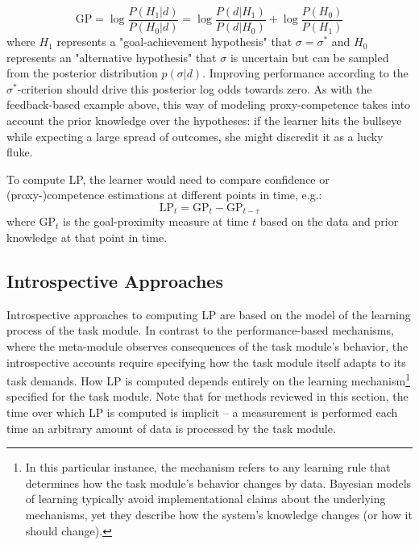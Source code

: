 \begin{equation}
   \mathrm{GP} = \log \frac{P(H_1|d)}{P(H_0|d)} = \log \frac{P(d|H_1)}{P(d|H_0)} + \log \frac{P(H_0)}{P(H_1)}
\end{equation}
where $H_1$ represents a "goal-achievement hypothesis" that $\sigma = \sigma^*$ and $H_0$ represents an "alternative hypothesis" that $\sigma$ is uncertain but can be sampled from the posterior distribution $p(\sigma|d)$. Improving performance according to the $\sigma^*$-criterion should drive this posterior log odds towards zero. As with the feedback-based example above, this way of modeling proxy-competence takes into account the prior knowledge over the hypotheses: if the learner hits the bullseye while expecting a large spread of outcomes, she might discredit it as a lucky fluke. 

To compute \ac{LP}, the learner would need to compare confidence or (proxy-)competence estimations at different points in time, e.g.:
\begin{equation}
   \mathrm{LP}_t = \mathrm{GP}_{t} - \mathrm{GP}_{t-\tau}
\end{equation}
where $\mathrm{GP}_t$ is the goal-proximity measure at time $t$ based on the data and prior knowledge at that point in time.

\subsection{Introspective Approaches}\label{subsec:introspective_approaches}

Introspective approaches to computing \ac{LP} are based on the model of the learning process of the task module. In contrast to the performance-based mechanisms, where the meta-module observes consequences of the task module's behavior, the introspective accounts require specifying how the task module itself adapts to its task demands. How \ac{LP} is computed depends entirely on the learning mechanism\footnote{In this particular instance, the mechanism refers to any learning rule that determines how the task module's behavior changes by data. Bayesian models of learning typically avoid implementational claims about the underlying mechanisms, yet they describe how the system's knowledge changes (or how it should change).} specified for the task module. Note that for methods reviewed in this section, the time over which \ac{LP} is computed is implicit -- a measurement is performed each time an arbitrary amount of data is processed by the task module.


